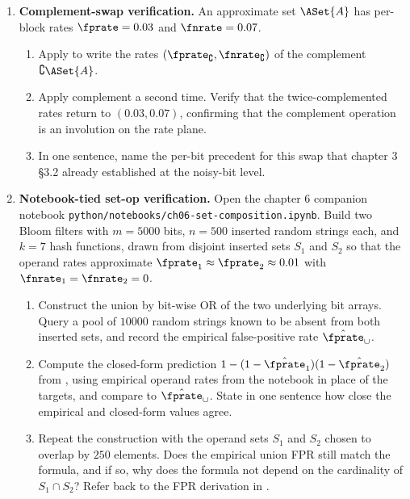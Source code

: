 \begin{enumerate}
\item \exstar
\label{ex:ch6-3}
\textbf{Complement-swap verification.}
An approximate set $\ASet{A}$ has per-block rates $\fprate = 0.03$ and
$\fnrate = 0.07$.
\begin{enumerate}
  \item[(a)] Apply  to write the rates
    $(\fprate_\complement, \fnrate_\complement)$ of the complement
    $\complement \ASet{A}$.
  \item[(b)] Apply complement a second time. Verify that the
    twice-complemented rates return to $(0.03, 0.07)$, confirming that
    the complement operation is an involution on the rate plane.
  \item[(c)] In one sentence, name the per-bit precedent for this
    swap that chapter 3 §3.2 already established at the noisy-bit
    level.
\end{enumerate}


\item \exstarstar
\label{ex:ch6-4}
\textbf{Notebook-tied set-op verification.}
Open the chapter 6 companion notebook
\texttt{python/notebooks/ch06-set-composition.ipynb}. Build two Bloom
filters with $m = 5000$ bits, $n = 500$ inserted random strings each,
and $k = 7$ hash functions, drawn from disjoint inserted sets $S_1$
and $S_2$ so that the operand rates approximate $\fprate_1 \approx
\fprate_2 \approx 0.01$ with $\fnrate_1 = \fnrate_2 = 0$.
\begin{enumerate}
  \item[(a)] Construct the union by bit-wise OR of the two underlying
    bit arrays. Query a pool of $10000$ random strings known to be
    absent from both inserted sets, and record the empirical
    false-positive rate $\hat{\fprate}_\cup$.
  \item[(b)] Compute the closed-form prediction
    $1 - (1 - \hat{\fprate}_1)(1 - \hat{\fprate}_2)$ from
    , using empirical operand rates from the
    notebook in place of the targets, and compare to
    $\hat{\fprate}_\cup$. State in one sentence how close the
    empirical and closed-form values agree.
  \item[(c)] Repeat the construction with the operand sets $S_1$ and
    $S_2$ chosen to overlap by $250$ elements. Does the empirical
    union FPR still match the formula, and if so, why does the formula
    not depend on the cardinality of $S_1 \cap S_2$? Refer back to
    the FPR derivation in .
\end{enumerate}


\end{enumerate}
